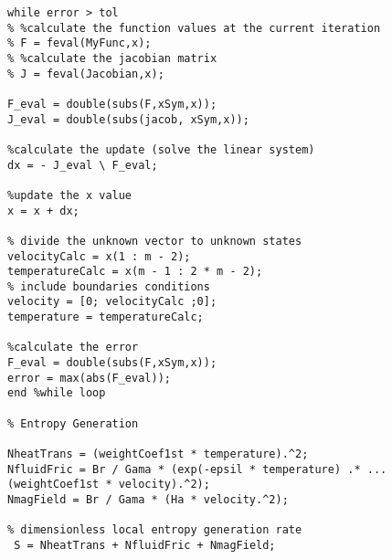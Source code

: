 \begin{lstlisting}
while error > tol
% %calculate the function values at the current iteration
% F = feval(MyFunc,x);
% %calculate the jacobian matrix
% J = feval(Jacobian,x);

F_eval = double(subs(F,xSym,x));
J_eval = double(subs(jacob, xSym,x));

%calculate the update (solve the linear system)
dx = - J_eval \ F_eval;

%update the x value
x = x + dx;

% divide the unknown vector to unknown states
velocityCalc = x(1 : m - 2);
temperatureCalc = x(m - 1 : 2 * m - 2);
% include boundaries conditions
velocity = [0; velocityCalc ;0];
temperature = temperatureCalc;

%calculate the error
F_eval = double(subs(F,xSym,x));
error = max(abs(F_eval));
end %while loop 

% Entropy Generation

NheatTrans = (weightCoef1st * temperature).^2;
NfluidFric = Br / Gama * (exp(-epsil * temperature) .* ...
(weightCoef1st * velocity).^2);
NmagField = Br / Gama * (Ha * velocity.^2);

% dimensionless local entropy generation rate
 S = NheatTrans + NfluidFric + NmagField;

\end{lstlisting}


